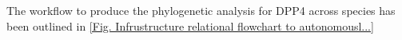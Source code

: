 The workflow to produce the phylogenetic analysis for DPP4 across species has been outlined in \ref{Fig. Infrustructure relational flowchart to autonomousl...}
